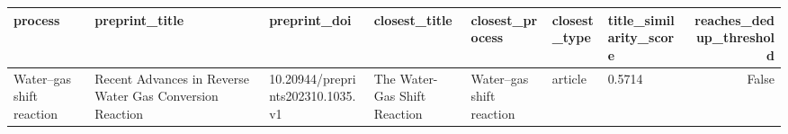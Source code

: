 \begin{tabular}{lllllllr}
\toprule
process & preprint\_title & preprint\_doi & closest\_title & closest\_process & closest\_type & title\_similarity\_score & reaches\_dedup\_threshold \\
\midrule
Water–gas shift reaction & Recent Advances in Reverse Water Gas Conversion Reaction & 10.20944/preprints202310.1035.v1 & The Water-Gas Shift Reaction & Water–gas shift reaction & article & 0.5714 & False \\
\bottomrule
\end{tabular}
